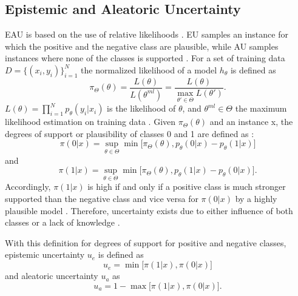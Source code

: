\subsection{Epistemic and Aleatoric Uncertainty}
\label{subsec:epistemic_and_alreatoric_uncertainty}
%
\Ac{EAU} is based on the use of relative likelihoods \cite{nguyen2021howtomeasure}. 
\Ac{EU} samples an instance for which the positive and the negative class are plausible, while \ac{AU} samples instances where none of the classes is supported \cite{nguyen2021howtomeasure}.
For a set of training data $D = \{(x_i, y_i)\}_{i=1}^{N}$ the normalized likelihood of a model $h_{\theta}$ is defined as \cite{nguyen2021howtomeasure}
\begin{equation}
\pi_{\Theta}(\theta) = \frac{L(\theta)}{L(\theta^{ml})} = \frac{L(\theta)}{\max_{\theta'\in \Theta}{L(\theta')}}.
\end{equation} 
$L(\theta) = \prod_{i=1}^{N}{p_{\theta}(y_i | x_i)} $ is the likelihood of $\theta$, and $\theta^{ml} \in \Theta$ the maximum likelihood estimation on training data \cite{nguyen2021howtomeasure}.
Given $\pi_{\Theta}(\theta)$ and an instance x, the degrees of support or plausibility of  classes 0 and 1 are defined as \cite{nguyen2021howtomeasure}:
\begin{equation}
\pi(0 | x) = \sup_{\theta \in \Theta} \min \bigg[ \pi_{\Theta}(\theta), p_{\theta}(0 | x) - p_{\theta}(1 | x)\bigg]
\end{equation} 
and
\begin{equation}
\pi(1 | x) = \sup_{\theta \in \Theta} \min \bigg[ \pi_{\Theta}(\theta), p_{\theta}(1 | x) - p_{\theta}(0 | x)\bigg].
\end{equation} 
Accordingly, $\pi(1 | x)$ is high if and only if a positive class is much stronger supported than the negative class and vice versa for $\pi(0 | x)$ by a highly plausible model  \cite{nguyen2021howtomeasure}.
Therefore, uncertainty exists due to either influence of both classes or a lack of knowledge \cite{nguyen2021howtomeasure}. 

With this definition for degrees of support for positive and negative classes, epistemic uncertainty $u_e$ is defined as \cite{nguyen2021howtomeasure}
\begin{equation}
u_e = \min \bigg[ \pi(1 | x), \pi(0 | x) \bigg]
\end{equation}
and aleatoric uncertainty $u_a$ as
\begin{equation}
u_a = 1 - \max \bigg[ \pi(1 | x), \pi(0 | x) \bigg].
\end{equation}

